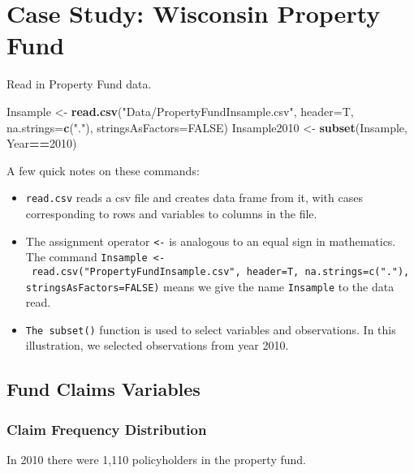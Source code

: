 \documentclass[]{book}
\newenvironment{Shaded}{\begin{snugshade}}{\end{snugshade}}
\newcommand{\KeywordTok}[1]{\textcolor[rgb]{0.13,0.29,0.53}{\textbf{#1}}}
\newcommand{\DataTypeTok}[1]{\textcolor[rgb]{0.13,0.29,0.53}{#1}}
\newcommand{\DecValTok}[1]{\textcolor[rgb]{0.00,0.00,0.81}{#1}}
\newcommand{\StringTok}[1]{\textcolor[rgb]{0.31,0.60,0.02}{#1}}
\newcommand{\OtherTok}[1]{\textcolor[rgb]{0.56,0.35,0.01}{#1}}
\newcommand{\OperatorTok}[1]{\textcolor[rgb]{0.81,0.36,0.00}{\textbf{#1}}}
\newcommand{\NormalTok}[1]{#1}
\theoremstyle{definition}
\theoremstyle{definition}
\theoremstyle{definition}
\theoremstyle{remark}
\begin{document}
\section{Case Study: Wisconsin Property
Fund}\label{case-study-wisconsin-property-fund}

Read in Property Fund data.

\begin{Shaded}
\begin{Highlighting}[]
\NormalTok{Insample <-}\StringTok{ }\KeywordTok{read.csv}\NormalTok{(}\StringTok{"Data/PropertyFundInsample.csv"}\NormalTok{, }\DataTypeTok{header=}\NormalTok{T, }\DataTypeTok{na.strings=}\KeywordTok{c}\NormalTok{(}\StringTok{"."}\NormalTok{), }\DataTypeTok{stringsAsFactors=}\OtherTok{FALSE}\NormalTok{)}
\NormalTok{Insample2010 <-}\StringTok{ }\KeywordTok{subset}\NormalTok{(Insample, Year}\OperatorTok{==}\DecValTok{2010}\NormalTok{)}
\end{Highlighting}
\end{Shaded}

A few quick notes on these commands:

\begin{itemize}
\item
  \texttt{read.csv} reads a csv file and creates data frame from it,
  with cases corresponding to rows and variables to columns in the file.
\item
  The assignment operator \texttt{\textless{}-} is analogous to an equal
  sign in mathematics. The command
  \texttt{Insample\ \textless{}-\ read.csv("PropertyFundInsample.csv",\ header=T,\ na.strings=c("."),\ stringsAsFactors=FALSE)}
  means we give the name \texttt{Insample} to the data read.
\item
  \texttt{The\ subset()} function is used to select variables and
  observations. In this illustration, we selected observations from year
  2010.
\end{itemize}

\subsection{Fund Claims Variables}\label{fund-claims-variables}

\subsubsection{Claim Frequency
Distribution}\label{claim-frequency-distribution}

In 2010 there were 1,110 policyholders in the property fund.
\end{document}

